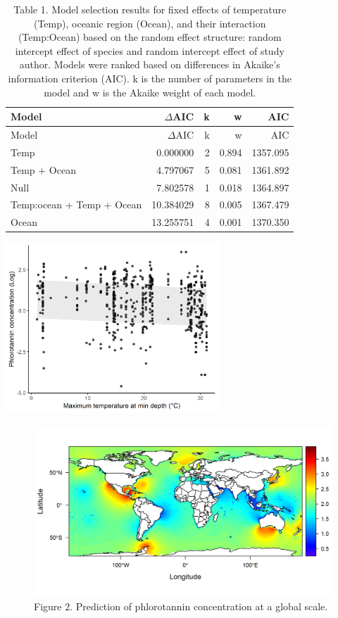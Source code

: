 \documentclass[]{article}
\begin{document}
\begin{longtable}[]{@{}lrrrr@{}}
\caption{Table 1. Model selection results for fixed effects of
temperature (Temp), oceanic region (Ocean), and their interaction
(Temp:Ocean) based on the random effect structure: random intercept
effect of species and random intercept effect of study author. Models
were ranked based on differences in Akaike's information criterion
(AIC). k is the number of parameters in the model and w is the Akaike
weight of each model.}\tabularnewline
\toprule
Model & \(\Delta\)AIC & k & w & AIC\tabularnewline
\midrule
\endfirsthead
\toprule
Model & \(\Delta\)AIC & k & w & AIC\tabularnewline
\midrule
\endhead
Temp & 0.000000 & 2 & 0.894 & 1357.095\tabularnewline
Temp + Ocean & 4.797067 & 5 & 0.081 & 1361.892\tabularnewline
Null & 7.802578 & 1 & 0.018 & 1364.897\tabularnewline
Temp:ocean + Temp + Ocean & 10.384029 & 8 & 0.005 &
1367.479\tabularnewline
Ocean & 13.255751 & 4 & 0.001 & 1370.350\tabularnewline
\bottomrule
\end{longtable}

\includegraphics[width=0.60000\textwidth]{temp_vs_phlor.png}

\begin{figure}
\centering
\includegraphics{predicted_map.png}
\caption{Figure 2. Prediction of phlorotannin concentration at a global
scale.}
\end{figure}
\end{document}
